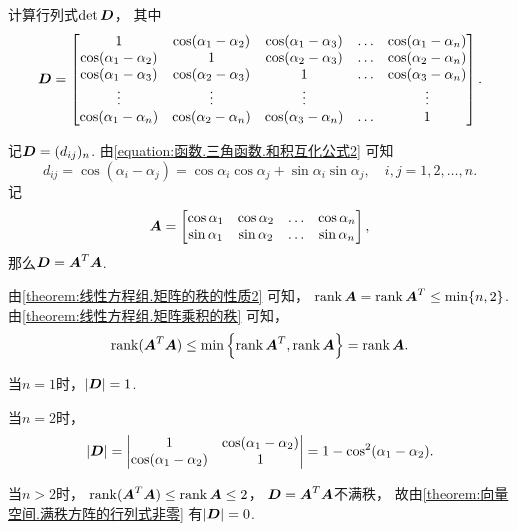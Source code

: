 \begin{example}
计算行列式\(\det\boldsymbol{D}\)，
其中\[
	\boldsymbol{D} = \begin{bmatrix}
		1 & \cos(\alpha_1-\alpha_2) & \cos(\alpha_1-\alpha_3) & \dots & \cos(\alpha_1-\alpha_n) \\
		\cos(\alpha_1-\alpha_2) & 1 & \cos(\alpha_2-\alpha_3) & \dots & \cos(\alpha_2-\alpha_n) \\
		\cos(\alpha_1-\alpha_3) & \cos(\alpha_2-\alpha_3) & 1 & \dots & \cos(\alpha_3-\alpha_n) \\
		\vdots & \vdots & \vdots & & \vdots \\
		\cos(\alpha_1-\alpha_n) & \cos(\alpha_2-\alpha_n) & \cos(\alpha_3-\alpha_n) & \dots & 1
	\end{bmatrix}.
\]
\begin{solution}
记\(\boldsymbol{D} = (d_{ij})_n\).
由\cref{equation:函数.三角函数.和积互化公式2} 可知\[
	d_{ij} = \cos(\alpha_i-\alpha_j)
	= \cos\alpha_i\cos\alpha_j+\sin\alpha_i\sin\alpha_j,
	\quad i,j=1,2,\dotsc,n.
\]
记\[
	\boldsymbol{A} = \begin{bmatrix}
		\cos\alpha_1 & \cos\alpha_2 & \dots & \cos\alpha_n \\
		\sin\alpha_1 & \sin\alpha_2 & \dots & \sin\alpha_n
	\end{bmatrix},
\]那么\(\boldsymbol{D} = \boldsymbol{A}^T \boldsymbol{A}\).

由\cref{theorem:线性方程组.矩阵的秩的性质2} 可知，
\(\rank\boldsymbol{A} = \rank\boldsymbol{A}^T \leq \min\{n,2\}\).
由\cref{theorem:线性方程组.矩阵乘积的秩} 可知，\[
	\rank(\boldsymbol{A}^T\boldsymbol{A}) \leq \min\left\{\rank\boldsymbol{A}^T,\rank\boldsymbol{A}\right\} = \rank\boldsymbol{A}.
\]

当\(n=1\)时，\(\abs{\boldsymbol{D}}=1\).

当\(n=2\)时，\[
	\abs{\boldsymbol{D}}
	= \begin{vmatrix}
		1 & \cos(\alpha_1-\alpha_2) \\
		\cos(\alpha_1-\alpha_2) & 1
	\end{vmatrix}
	= 1 - \cos^2(\alpha_1-\alpha_2).
\]

当\(n>2\)时，
\(\rank(\boldsymbol{A}^T\boldsymbol{A}) \leq \rank\boldsymbol{A} \leq2\)，
\(\boldsymbol{D} = \boldsymbol{A}^T \boldsymbol{A}\)不满秩，
故由\cref{theorem:向量空间.满秩方阵的行列式非零} 有\(\abs{\boldsymbol{D}}=0\).
\end{solution}
\end{example}

